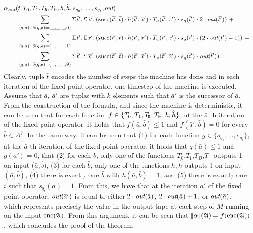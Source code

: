 \begin{align*}
\alpha_{\text{\it out}}(&\bar{t},T_0,T_1,T_{\mathtt{B}},T_{\vdash},h,\hat{h},s_{q_0},\ldots,s_{q_{\ell}},\text{\it out}) =\\
&\sum_{(q,a) \,:\, \delta(q,a) = (\_,\_,\_,0)}\Sigma{\bar{t}'}.\,\Sigma{\bar{x}'}.\,(\text{succ}(\bar{t}',\bar{t}) \cdot h(\bar{t}',\bar{x}') \cdot T_a(\bar{t}',\bar{x}') \cdot s_{q}(\bar{t}') \cdot 2\cdot \text{\it out}(\bar{t}')) \ + \\
&\sum_{(q,a) \,:\,\delta(q,a) = (\_,\_,\_,1)}\Sigma{\bar{t}'}.\,\Sigma{\bar{x}'}.\,(\text{succ}(\bar{t}',\bar{t}) \cdot h(\bar{t}',\bar{x}') \cdot T_a(\bar{t}',\bar{x}') \cdot s_{q}(\bar{t}') \cdot (2\cdot \text{\it out}(\bar{t}')+1)) \ + \\ 
&\sum_{(q,a) \,:\,\delta(q,a) = (\_,\_,\_,\emptyset)}\Sigma{\bar{t}'}.\,\Sigma{\bar{x}'}.\,(\text{succ}(\bar{t}',\bar{t}) \cdot h(\bar{t}',\bar{x}') \cdot T_a(\bar{t}',\bar{x}') \cdot s_{q}(\bar{t}') \cdot \text{\it out}(\bar{t}')).
\end{align*}
Clearly, tuple $\bar{t}$ encodes the number of steps the machine has done and in each iteration of the fixed point operator, one timestep of the machine is executed.
Assume that $\bar{a}$, $\bar{a}'$ are tuples with $k$ elements such that $\bar{a}'$ is the successor of $\bar{a}$. 
From the construction of the formula, and since the machine is deterministic, it can be seen that for each function $f \in\{T_0,T_1,T_{\mathtt{B}},T_{\vdash},h,\hat{h}\}$, at the $\bar{a}$-th iteration of the fixed point operator, it holds that $f(\bar{a},\bar{b}) \leq 1$ and  $f(\bar{a}',\bar{b}) = 0$ for every $\bar{b}\in A^k$. In the same way, it can be seen that (1) for each function $g \in\{s_{q_1},\ldots,s_{q_{\ell}}\}$, at the $\bar{a}$-th iteration of the fixed point operator, it holds that $g(\bar{a}) \leq 1$ and $g(\bar{a}') = 0$, that (2) for each $\bar{b}$, only one of the functions $T_0$,$T_1$,$T_B$,$T_{\vdash}$ outputs 1 on input ($\bar{a}, \bar{b})$, (3) for each $\bar{b}$, only one of the functions $h,\hat{h}$ outputs 1 on input $(\bar{a}, \bar{b})$, (4) there is exactly one $\bar{b}$ with $h(\bar{a}, \bar{b}) = 1$, and (5) there is exactly one $i$ such that $s_{q_i}(\bar{a}) = 1$. From this, we have that at the iteration $\bar{a}'$ of the fixed point operator, $\text{\it out}(\bar{a}')$ is equal to either $2\cdot \text{\it out}(\bar{a})$, $2\cdot \text{\it out}(\bar{a}) + 1$, or $\text{\it out}(\bar{a})$, which represents precisely the value in the output tape at each step of $M$ running on the input ${\rm enc}(\mathfrak{A})$. From this argument, it can be seen that ${\llbracket{}{\alpha}\rrbracket}(\mathfrak{A}) = f({\rm enc}(\mathfrak{A}))$, which concludes the proof of the theorem.
